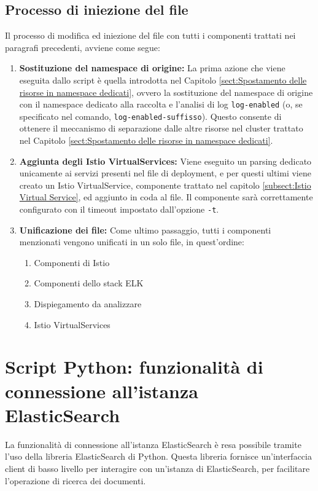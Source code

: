 \subsection{Processo di iniezione del file}
Il processo di modifica ed iniezione del file con tutti i componenti trattati nei paragrafi precedenti, avviene come segue:
\begin{enumerate}
    \item \textbf{Sostituzione del namespace di origine:} La prima azione che viene eseguita dallo script è quella introdotta nel Capitolo \ref{sect:Spostamento delle risorse in namespace dedicati}, ovvero la sostituzione del namespace di origine con il namespace dedicato alla raccolta e l'analisi di log \verb|log-enabled| (o, se specificato nel comando, \verb|log-enabled-suffisso|). Questo consente di ottenere il meccanismo di separazione dalle altre risorse nel cluster trattato nel Capitolo \ref{sect:Spostamento delle risorse in namespace dedicati}.


\item \textbf{Aggiunta degli Istio VirtualServices:}
Viene eseguito un parsing dedicato unicamente ai servizi presenti nel file di deployment, e per questi ultimi viene creato un Istio VirtualService, componente trattato nel capitolo \ref{subsect:Istio Virtual Service}, ed aggiunto in coda al file. Il componente sarà correttamente configurato con il timeout impostato dall'opzione \texttt{-t}.

\item \textbf{Unificazione dei file:}
Come ultimo passaggio, tutti i componenti menzionati vengono unificati in un solo file, in quest'ordine:
\begin{enumerate}
    \item Componenti di Istio
    \item Componenti dello stack ELK
    \item Dispiegamento da analizzare
    \item Istio VirtualServices
\end{enumerate}
\end{enumerate}

\section{Script Python: funzionalità di connessione all'istanza ElasticSearch}
La funzionalità di connessione all'istanza ElasticSearch è resa possibile tramite l'uso della libreria ElasticSearch di Python. Questa libreria fornisce un'interfaccia client di basso livello per interagire con un'istanza di ElasticSearch, per facilitare l'operazione di ricerca dei documenti.

